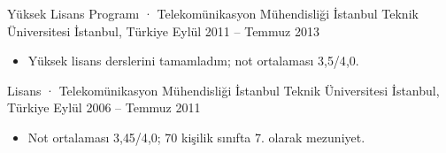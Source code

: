 \resumeSubheading
  {Yüksek Lisans Programı · Telekomünikasyon Mühendisliği}
  {İstanbul Teknik Üniversitesi}
  {İstanbul, Türkiye}
  {Eylül 2011 -- Temmuz 2013}
\begin{itemize}
  \item Yüksek lisans derslerini tamamladım; not ortalaması 3{,}5/4{,}0.
\end{itemize}
\vspace{0.2em}

\resumeSubheading
  {Lisans · Telekomünikasyon Mühendisliği}
  {İstanbul Teknik Üniversitesi}
  {İstanbul, Türkiye}
  {Eylül 2006 -- Temmuz 2011}
\begin{itemize}
  \item Not ortalaması 3{,}45/4{,}0; 70 kişilik sınıfta 7. olarak mezuniyet.
\end{itemize}
